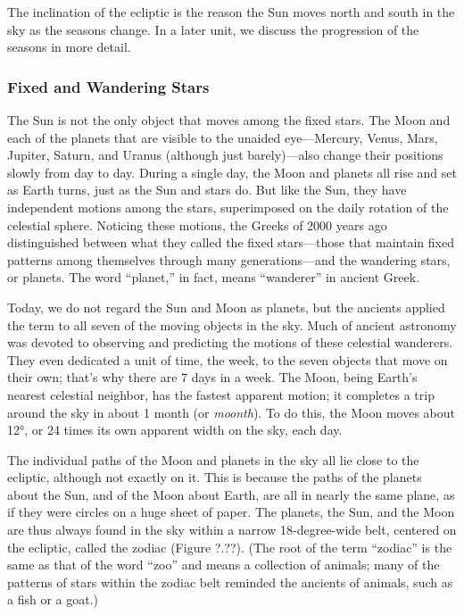 \documentclass[main.tex]{subfiles}
\begin{document}

\vspace{1em}

The inclination of the ecliptic is the reason the Sun moves north and south in the sky as the seasons change. In a later unit, we discuss the progression of the seasons in more detail.

\subsubsection*{Fixed and Wandering Stars}

The Sun is not the only object that moves among the fixed stars. The Moon and each of the planets that are visible to the unaided eye---Mercury, Venus, Mars, Jupiter, Saturn, and Uranus (although just barely)---also change their positions slowly from day to day. During a single day, the Moon and planets all rise and set as Earth turns, just as the Sun and stars do. But like the Sun, they have independent motions among the stars, superimposed on the daily rotation of the celestial sphere. Noticing these motions, the Greeks of 2000 years ago distinguished between what they called the fixed stars---those that maintain fixed patterns among themselves through many generations---and the wandering stars, or \gls{planets}. The word ``planet,'' in fact, means ``wanderer'' in ancient Greek.

\vspace{1em}

Today, we do not regard the Sun and Moon as planets, but the ancients applied the term to all seven of the moving objects in the sky. Much of ancient astronomy was devoted to observing and predicting the motions of these celestial wanderers. They even dedicated a unit of time, the week, to the seven objects that move on their own; that's why there are 7 days in a week. The Moon, being Earth's nearest celestial neighbor, has the fastest apparent motion; it completes a trip around the sky in about 1 month (or \textit{moonth}). To do this, the Moon moves about \ang{12}, or 24 times its own apparent width on the sky, each day.

\vspace{1em}

The individual paths of the Moon and planets in the sky all lie close to the ecliptic, although not exactly on it. This is because the paths of the planets about the Sun, and of the Moon about Earth, are all in nearly the same plane, as if they were circles on a huge sheet of paper. The planets, the Sun, and the Moon are thus always found in the sky within a narrow 18-degree-wide belt, centered on the ecliptic, called the \gls{zodiac} (Figure ?.??). (The root of the term ``zodiac'' is the same as that of the word ``zoo'' and means a collection of animals; many of the patterns of stars within the zodiac belt reminded the ancients of animals, such as a fish or a goat.)
\end{document}
